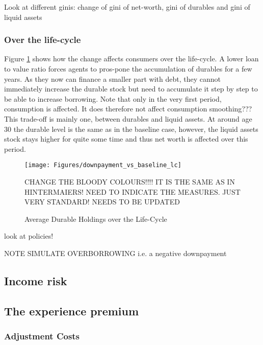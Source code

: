 \documentclass[a4paper,12pt]{article}
\begin{document}
Look at different ginis: change of gini of net-worth, gini of durables and gini of liquid assets

\subsubsection{Over the life-cycle}
Figure \ref{downpayment_vs_baseline_lc} shows how the change affects consumers over the life-cycle. A lower loan to value ratio forces agents to  pros-pone the accumulation of durables for a few years. As they now can finance a smaller part with debt, they cannot immediately  increase the durable stock but need to accumulate it step by step to be able to increase borrowing. Note that only in the very first period, consumption is affected. It does therefore not affect consumption smoothing??? This trade-off is mainly one, between durables and liquid assets. At around age 30 the durable level is the same as in the baseline case, however, the liquid assets stock stays higher for quite some time and thus net worth is affected over this period. 


\begin{figure}[!htbp]
\caption{Average Durable Holdings over the Life-Cycle} 
\label{downpayment_vs_baseline_lc}	%
\centering
\texttt{[image: Figures/downpayment\_vs\_baseline\_lc]}  %

\begin{minipage}{0.8\linewidth}
\footnotesize{CHANGE THE BLOODY COLOURS!!!! IT IS THE SAME AS IN HINTERMAIERS! NEED TO INDICATE THE MEASURES. JUST VERY STANDARD! NEEDS TO BE UPDATED}
\end{minipage}

\end{figure}


look at policies! 

NOTE SIMULATE OVERBORROWING i.e. a negative downpayment


\subsection{Income risk}

\subsection{The experience premium}


\subsubsection{Adjustment Costs}
\end{document}
